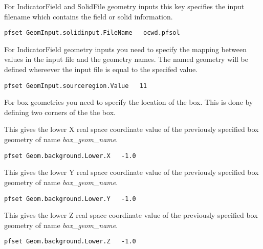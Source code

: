 {
For IndicatorField and SolidFile geometry inputs this key specifies
the input filename which contains the field or solid information.
}
\begin{display}\begin{verbatim}
pfset GeomInput.solidinput.FileName   ocwd.pfsol
\end{verbatim}\end{display}


{
For IndicatorField geometry inputs you need to specify the mapping between
values in the input file and the geometry names.  The named geometry will
be defined whereever the input file is equal to the specifed value.
}
\begin{display}\begin{verbatim}
pfset GeomInput.sourceregion.Value   11
\end{verbatim}\end{display}

For box geometries you need to specify the location of the box.  This
is done by defining two corners of the the box.

{This gives the lower X real space coordinate value
of the previously specified box geometry of name {\em box\_geom\_name}.}
\begin{display}\begin{verbatim}
pfset Geom.background.Lower.X   -1.0
\end{verbatim}\end{display}

{This gives the lower Y real space coordinate value
of the previously specified box geometry of name {\em box\_geom\_name}.}
\begin{display}\begin{verbatim}
pfset Geom.background.Lower.Y   -1.0
\end{verbatim}\end{display}

{This gives the lower Z real space coordinate value
of the previously specified box geometry of name {\em box\_geom\_name}.}
\begin{display}\begin{verbatim}
pfset Geom.background.Lower.Z   -1.0
\end{verbatim}\end{display}

